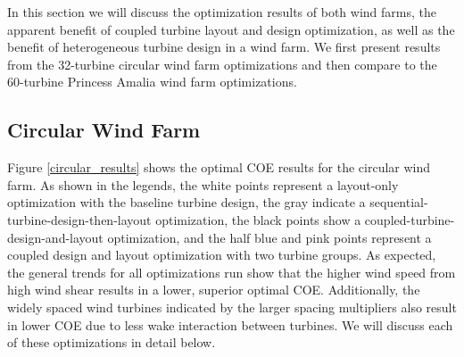 \newcommand\myeq{\mkern1.5mu{=}\mkern1.5mu}


In this section we will discuss the optimization results of both wind farms, the apparent benefit of coupled turbine layout and design optimization, as well as the benefit of heterogeneous turbine design in a wind farm.
We first present results from the 32-turbine circular wind farm optimizations and then compare to the 60-turbine Princess Amalia wind farm optimizations. 



\subsection{Circular Wind Farm}

Figure \ref{circular_results} shows the optimal COE results for the circular wind farm. As shown in the legends, the white points represent a layout-only optimization with the baseline turbine design, the gray indicate a sequential-turbine-design-then-layout optimization, the black points show a coupled-turbine-design-and-layout optimization, and the half blue and pink points represent a coupled design and layout optimization with two turbine groups.  As expected, the general trends for all optimizations run show that the higher wind speed from high wind shear results in a lower, superior optimal COE. Additionally, the widely spaced wind turbines indicated by the larger spacing multipliers also result in lower COE due to less wake interaction between turbines. We will discuss each of these optimizations in detail below.



